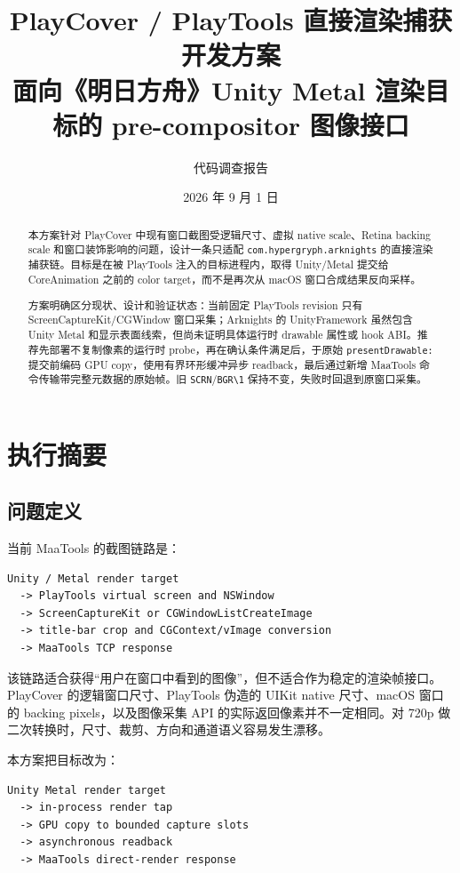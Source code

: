 \documentclass[UTF8,a4paper,11pt]{ctexart}
\title{PlayCover / PlayTools 直接渲染捕获开发方案\\
  \large 面向《明日方舟》Unity Metal 渲染目标的 pre-compositor 图像接口}
\author{代码调查报告}
\date{2026 年 9 月 1 日}
\begin{document}
\pagestyle{plain}
\maketitle
\thispagestyle{empty}

\begin{abstract}
本方案针对 PlayCover 中现有窗口截图受逻辑尺寸、虚拟 native scale、Retina backing scale 和窗口装饰影响的问题，设计一条只适配 \texttt{com.hypergryph.arknights} 的直接渲染捕获链。目标是在被 PlayTools 注入的目标进程内，取得 Unity/Metal 提交给 CoreAnimation 之前的 color target，而不是再次从 macOS 窗口合成结果反向采样。

方案明确区分现状、设计和验证状态：当前固定 PlayTools revision 只有 ScreenCaptureKit/CGWindow 窗口采集；Arknights 的 UnityFramework 虽然包含 Unity Metal 和显示表面线索，但尚未证明具体运行时 drawable 属性或 hook ABI。推荐先部署不复制像素的运行时 probe，再在确认条件满足后，于原始 \texttt{presentDrawable:} 提交前编码 GPU copy，使用有界环形缓冲异步 readback，最后通过新增 MaaTools 命令传输带完整元数据的原始帧。旧 \texttt{SCRN}/\texttt{BGR\textbackslash{}1} 保持不变，失败时回退到原窗口采集。
\end{abstract}

\tableofcontents
\clearpage

\section{执行摘要}

\subsection{问题定义}

当前 MaaTools 的截图链路是：

\begin{lstlisting}
Unity / Metal render target
  -> PlayTools virtual screen and NSWindow
  -> ScreenCaptureKit or CGWindowListCreateImage
  -> title-bar crop and CGContext/vImage conversion
  -> MaaTools TCP response
\end{lstlisting}

该链路适合获得“用户在窗口中看到的图像”，但不适合作为稳定的渲染帧接口。PlayCover 的逻辑窗口尺寸、PlayTools 伪造的 UIKit native 尺寸、macOS 窗口的 backing pixels，以及图像采集 API 的实际返回像素并不一定相同。对 720p 做二次转换时，尺寸、裁剪、方向和通道语义容易发生漂移。

本方案把目标改为：

\begin{lstlisting}
Unity Metal render target
  -> in-process render tap
  -> GPU copy to bounded capture slots
  -> asynchronous readback
  -> MaaTools direct-render response
\end{lstlisting}
\end{document}
